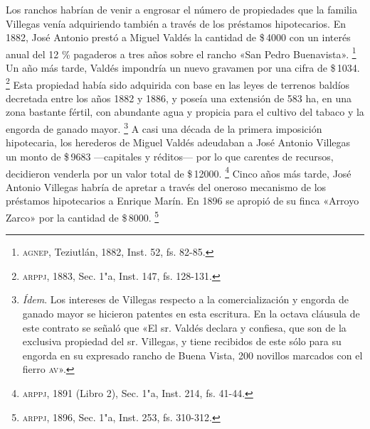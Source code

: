 \documentclass[14pt,twoside,final]{extbook} %
\let\oldfootnote\footnote
\renewcommand\footnote[1]{%
\oldfootnote{\hspace{1mm}#1}}
\begin{document}
Los ranchos habrían de venir a engrosar el número de propiedades que la familia Villegas venía adquiriendo también a través de los préstamos hipotecarios. En 1882, José Antonio prestó a Miguel Valdés la cantidad de \$\,4000 con un interés anual del 12 \% pagaderos a tres años sobre el rancho «San Pedro Buenavista».\footnote{\textsc{agnep}, Teziutlán, 1882, Inst. 52, fs. 82-85.} Un año más tarde, Valdés impondría un nuevo gravamen por una cifra de \$\,1034.\footnote{\textsc{arppj}, 1883, Sec. 1"a, Inst. 147, fs. 128-131.} Esta propiedad había sido adquirida con base en las leyes de terrenos baldíos decretada entre los años 1882 y 1886, y poseía una extensión de 583 ha, en una zona bastante fértil, con abundante agua y propicia para el cultivo del tabaco y la engorda de ganado mayor.\footnote{\emph{Ídem}. Los intereses de Villegas respecto a la comercialización y engorda de ganado mayor se hicieron patentes en esta escritura. En la octava cláusula de este contrato se señaló que «El sr. Valdés declara y confiesa, que son de la exclusiva propiedad del sr. Villegas, y tiene recibidos de este sólo para su engorda en su expresado rancho de Buena Vista, 200 novillos marcados con el fierro \textsc{av}».} A casi una década de la primera imposición hipotecaria, los herederos de Miguel Valdés adeudaban a José Antonio Villegas un monto de \$\,9683 ---capitales y réditos--- por lo que carentes de recursos, decidieron venderla por un valor total de \$\,12000.\footnote{\textsc{arppj}, 1891 (Libro 2), Sec. 1"a, Inst. 214, fs. 41-44.} Cinco años más tarde, José Antonio Villegas habría de apretar a través del oneroso mecanismo de los préstamos hipotecarios a Enrique Marín. En 1896 se apropió de su finca «Arroyo Zarco» por la cantidad de \$\,8000.\footnote{\textsc{arppj}, 1896, Sec. 1"a, Inst. 253, fs. 310-312.}
\end{document}
